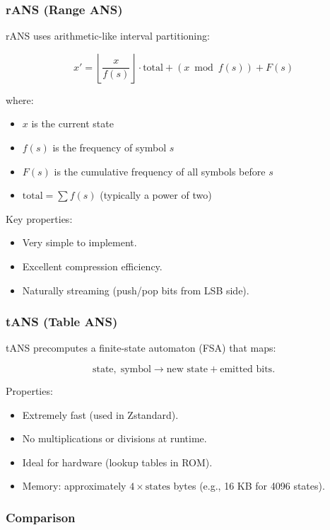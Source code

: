 \subsubsection{rANS (Range ANS)}

rANS uses arithmetic-like interval partitioning:

\[
x' = \left\lfloor \frac{x}{f(s)} \right\rfloor \cdot \text{total} + (x \bmod f(s)) + F(s)
\]

where:
\begin{itemize}
    \item $x$ is the current state
    \item $f(s)$ is the frequency of symbol $s$
    \item $F(s)$ is the cumulative frequency of all symbols before $s$
    \item $\text{total} = \sum f(s)$ (typically a power of two)
\end{itemize}

Key properties:

\begin{itemize}
    \item Very simple to implement.
    \item Excellent compression efficiency.
    \item Naturally streaming (push/pop bits from LSB side).
\end{itemize}

\subsubsection{tANS (Table ANS)}

tANS precomputes a finite-state automaton (FSA) that maps:

\[
\text{state},\; \text{symbol} \longrightarrow \text{new state} + \text{emitted bits}.
\]

Properties:

\begin{itemize}
    \item Extremely fast (used in Zstandard).
    \item No multiplications or divisions at runtime.
    \item Ideal for hardware (lookup tables in ROM).
    \item Memory: approximately $4 \times \text{states}$ bytes (e.g., 16 KB for 4096 states).
\end{itemize}

\subsubsection{Comparison}

